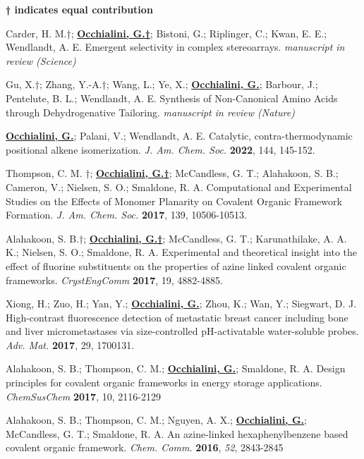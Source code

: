 
\begin{rSection}{}

  \textbf{† indicates equal contribution}
  
 Carder, H. M.†; \underline{\textbf{Occhialini, G.†}}; Bistoni, G.; Riplinger, C.; Kwan, E. E.; Wendlandt, A. E. Emergent selectivity in complex stereoarrays. \textit{manuscript in review (Science)}
 
 Gu, X.†; Zhang, Y.-A.†; Wang, L.; Ye, X.; \underline{\textbf{Occhialini, G.}}; Barbour, J.; Pentelute, B. L.; Wendlandt, A. E. Synthesis of Non-Canonical Amino Acids through Dehydrogenative Tailoring. \textit{manuscript in review (Nature)}
 
 \underline{\textbf{Occhialini, G.}}; Palani, V.; Wendlandt, A. E. Catalytic, contra-thermodynamic positional alkene isomerization. \textit{J. Am. Chem. Soc.} \textbf{2022}, 144, 145-152.
 
 Thompson, C. M. †; \underline{\textbf{Occhialini, G.†}}; McCandless, G. T.; Alahakoon, S. B.; Cameron, V.; Nielsen, S. O.; Smaldone, R. A. Computational and Experimental Studies on the Effects of Monomer Planarity on Covalent Organic Framework Formation. \textit{J. Am. Chem. Soc.} \textbf{2017}, 139, 10506-10513.
 
 Alahakoon, S. B.†; \underline{\textbf{Occhialini, G.†}}; McCandless, G. T.; Karunathilake, A. A. K.; Nielsen, S. O.; Smaldone, R. A. Experimental and theoretical insight into the effect of fluorine substituents on the properties of azine linked covalent organic frameworks. \textit{CrystEngComm} \textbf{2017}, 19, 4882-4885.
 
 Xiong, H.; Zuo, H.; Yan, Y.; \underline{\textbf{Occhialini, G.}}; Zhou, K.; Wan, Y.; Siegwart, D. J. High-contrast fluorescence detection of metastatic breast cancer including bone and liver micrometastases via size-controlled pH-activatable water-soluble probes. \textit{Adv. Mat.} \textbf{2017}, 29, 1700131.
 
 Alahakoon, S. B.; Thompson, C. M.; \underline{\textbf{Occhialini, G.}}; Smaldone, R. A. Design principles for covalent organic frameworks in energy storage applications. \textit{ChemSusChem} \textbf{2017}, 10, 2116-2129

 Alahakoon, S. B.; Thompson, C. M.; Nguyen, A. X.; \underline{\textbf{Occhialini, G.}}; McCandless, G. T.; Smaldone, R. A. An azine-linked hexaphenylbenzene based covalent organic framework. \textit{Chem. Comm.} \textbf{2016}, \textit{52}, 2843-2845

\end{rSection}